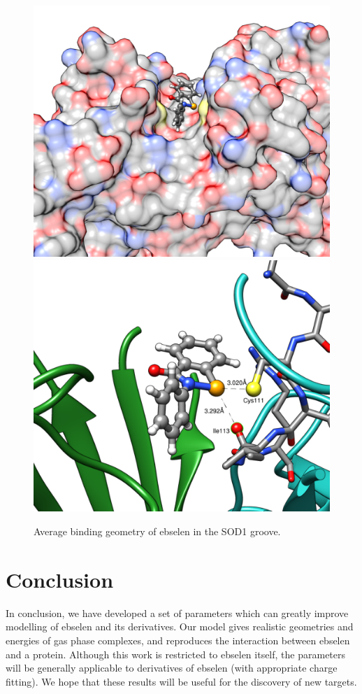 \begin{refsection}
\begin{figure}
    \centering
    \includegraphics[width=0.45\linewidth]{Figures/sod1-ebs-a.pdf}
    \includegraphics[width=0.45\linewidth]{Figures/sod1-ebs-b.pdf}
    \caption{Average binding geometry of ebselen in the SOD1 groove.}
    \label{fig:sod1-ebs}
\end{figure}

\section{Conclusion}
In conclusion, we have developed a set of parameters which can greatly improve modelling of ebselen and its derivatives.
Our model gives realistic geometries and energies of gas phase complexes, and reproduces the interaction between ebselen and a protein.
Although this work is restricted to ebselen itself, the parameters will be generally applicable to derivatives of ebselen (with appropriate charge fitting).
We hope that these results will be useful for the discovery of new targets.

\printbibliography[heading=subbibliography]
\end{refsection}
